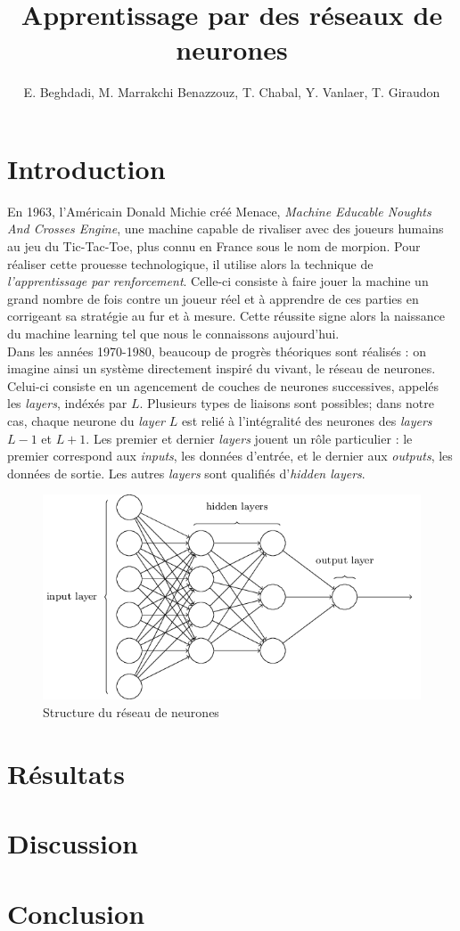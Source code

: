 \documentclass[a4paper,10pt]{article}
\title{Apprentissage par des réseaux de neurones}
\author{E. Beghdadi, M. Marrakchi Benazzouz, T. Chabal, Y. Vanlaer, T. Giraudon}
\begin{document}
\maketitle

\begin{abstract}

\end{abstract}

\section{Introduction}
En 1963, l'Américain Donald Michie créé Menace, \textit{Machine Educable Noughts And Crosses Engine},
une machine capable de rivaliser avec des joueurs humains au jeu du Tic-Tac-Toe, plus connu en France sous le nom de morpion.
Pour réaliser cette prouesse technologique, il utilise alors la technique de \textit{l'apprentissage par renforcement}.
Celle-ci consiste à faire jouer la machine un grand nombre de fois contre un joueur réel et à apprendre de ces parties
en corrigeant sa stratégie au fur et à mesure. Cette réussite signe alors la naissance du machine learning tel que
nous le connaissons aujourd'hui. \\
Dans les années 1970-1980, beaucoup de progrès théoriques sont réalisés : on imagine ainsi un système
directement inspiré du vivant, le réseau de neurones. Celui-ci consiste en un agencement de couches de neurones successives,
appelés les \textit{layers}, indéxés par $L$. Plusieurs types de liaisons sont possibles; dans notre cas, chaque neurone du
\textit{layer} $L$ est relié à l'intégralité des neurones des \textit{layers} $L-1$ et $L+1$. Les premier et dernier \textit{layers}
jouent un rôle particulier : le premier correspond aux \textit{inputs}, les données d'entrée, et le dernier aux \textit{outputs},
les données de sortie. Les autres \textit{layers} sont qualifiés d'\textit{hidden layers}.
\\

\begin{figure}[h]
\centering
\includegraphics[scale = 0.4]{layers}
\caption{Structure du réseau de neurones}
 
\end{figure}



\section{Résultats}

\section{Discussion}

\section{Conclusion}
\end{document}
